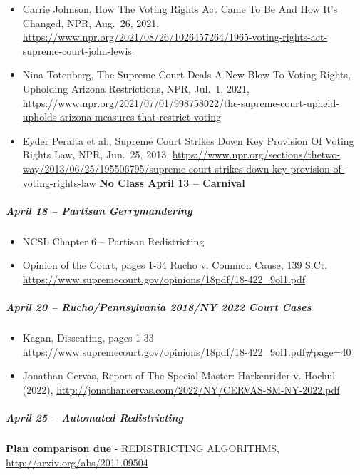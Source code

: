 \documentclass[
]{article}
\providecommand{\tightlist}{%
  \setlength{\itemsep}{0pt}\setlength{\parskip}{0pt}}
\begin{document}
\begin{itemize}
\tightlist
\item
  Carrie Johnson, How The Voting Rights Act Came To Be And How It's
  Changed, NPR, Aug.~26, 2021,
  \url{https://www.npr.org/2021/08/26/1026457264/1965-voting-rights-act-supreme-court-john-lewis}
\item
  Nina Totenberg, The Supreme Court Deals A New Blow To Voting Rights,
  Upholding Arizona Restrictions, NPR, Jul.~1, 2021,
  \url{https://www.npr.org/2021/07/01/998758022/the-supreme-court-upheld-upholds-arizona-measures-that-restrict-voting}
\item
  Eyder Peralta et al., Supreme Court Strikes Down Key Provision Of
  Voting Rights Law, NPR, Jun.~25, 2013,
  \url{https://www.npr.org/sections/thetwo-way/2013/06/25/195506795/supreme-court-strikes-down-key-provision-of-voting-rights-law}
  \textbf{No Class April 13 -- Carnival}
\end{itemize}

\hypertarget{april-18-partisan-gerrymandering}{%
\subparagraph{April 18 -- Partisan
Gerrymandering}\label{april-18-partisan-gerrymandering}}

\begin{itemize}
\tightlist
\item
  NCSL Chapter 6 -- Partisan Redistricting
\item
  Opinion of the Court, pages 1-34 Rucho v. Common Cause, 139 S.Ct.
  \url{https://www.supremecourt.gov/opinions/18pdf/18-422_9ol1.pdf}
\end{itemize}

\hypertarget{april-20-ruchopennsylvania-2018ny-2022-court-cases}{%
\subparagraph{April 20 -- Rucho/Pennsylvania 2018/NY 2022 Court
Cases}\label{april-20-ruchopennsylvania-2018ny-2022-court-cases}}

\begin{itemize}
\tightlist
\item
  Kagan, Dissenting, pages 1-33
  \url{https://www.supremecourt.gov/opinions/18pdf/18-422_9ol1.pdf\#page=40}
\item
  Jonathan Cervas, Report of The Special Master: Harkenrider v. Hochul
  (2022), \url{http://jonathancervas.com/2022/NY/CERVAS-SM-NY-2022.pdf}
\end{itemize}

\hypertarget{april-25-automated-redistricting}{%
\subparagraph{April 25 -- Automated
Redistricting}\label{april-25-automated-redistricting}}

\textbf{Plan comparison due} - REDISTRICTING ALGORITHMS,
\url{http://arxiv.org/abs/2011.09504}
\end{document}
